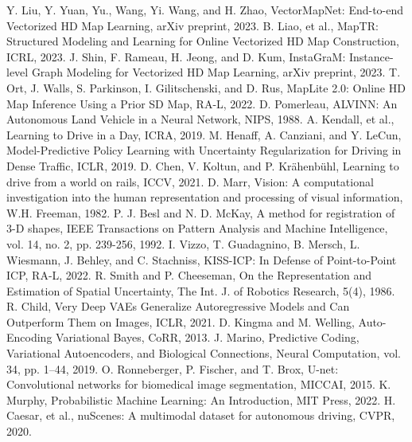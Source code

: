\documentclass[letterpaper, 10 pt, conference]{ieeeconf}
\begin{document}
\begin{thebibliography}{99}
 Y. Liu, Y. Yuan, Yu., Wang, Yi. Wang, and H. Zhao, VectorMapNet: End-to-end Vectorized HD Map Learning, arXiv preprint, 2023.
 B. Liao, et al., MapTR: Structured Modeling and Learning for Online Vectorized HD Map Construction, ICRL, 2023.
 J. Shin, F. Rameau, H. Jeong, and D. Kum, InstaGraM: Instance-level Graph Modeling for Vectorized HD Map Learning, arXiv preprint, 2023.
 T. Ort, J. Walls, S. Parkinson, I. Gilitschenski, and D. Rus, MapLite 2.0: Online HD Map Inference Using a Prior SD Map, RA-L, 2022.
 D. Pomerleau, ALVINN: An Autonomous Land Vehicle in a Neural Network, NIPS, 1988.
 A. Kendall, et al., Learning to Drive in a Day, ICRA, 2019.
 M. Henaff, A. Canziani, and Y. LeCun, Model-Predictive Policy Learning with Uncertainty Regularization for Driving in Dense Traffic, ICLR, 2019.
 D. Chen, V. Koltun, and P. Kr\"ahenb\"uhl, Learning to drive from a world on rails, ICCV, 2021.
 D. Marr, Vision: A computational investigation into the human representation and processing of visual information, W.H. Freeman, 1982.
 P. J. Besl and N. D. McKay, A method for registration of 3-D shapes, IEEE Transactions on Pattern Analysis and Machine Intelligence, vol. 14, no. 2, pp. 239-256, 1992.
 I. Vizzo, T. Guadagnino, B. Mersch, L. Wiesmann, J. Behley, and C. Stachniss, KISS-ICP: In Defense of Point-to-Point ICP, RA-L, 2022.
 R. Smith and P. Cheeseman, On the Representation and Estimation of Spatial Uncertainty, The Int. J. of Robotics Research, 5(4), 1986.
 R. Child, Very Deep VAEs Generalize Autoregressive Models and Can Outperform Them on Images, ICLR, 2021.
 D. Kingma and M. Welling, Auto-Encoding Variational Bayes, CoRR, 2013.
 J. Marino, Predictive Coding, Variational Autoencoders, and Biological Connections, Neural Computation, vol. 34, pp. 1--44, 2019.
 O. Ronneberger, P. Fischer, and T. Brox, U-net: Convolutional networks for biomedical image segmentation, MICCAI, 2015.
 K. Murphy, Probabilistic Machine Learning: An Introduction, MIT Press, 2022.
 H. Caesar, et al., nuScenes: A multimodal dataset for autonomous driving, CVPR, 2020.
\end{thebibliography}
\end{document}
